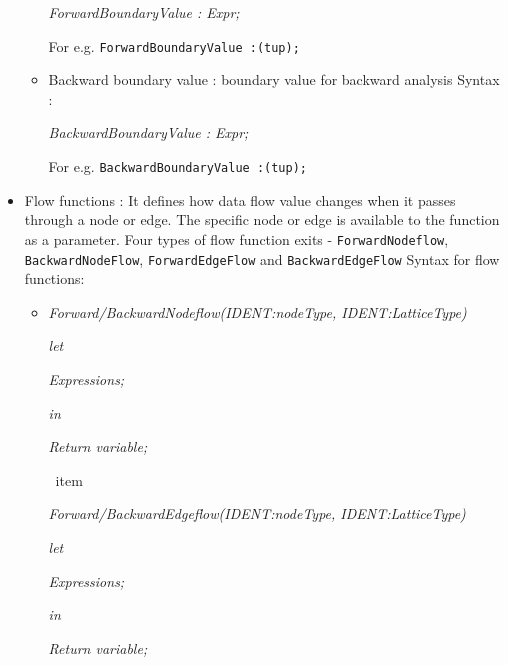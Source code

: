 \documentclass[11pt,a4paper,openright]{report}
\begin{document}
\begin{itemize}
\begin{itemize}
					    \hspace{15mm} \textit{ForwardBoundaryValue : Expr;}
					    
					    \hspace{15mm} For e.g. \texttt{ForwardBoundaryValue :(tup){};}
	\item Backward boundary value : boundary value for backward analysis
	 \newline Syntax : 
			  
					    \hspace{15mm} \textit{BackwardBoundaryValue : Expr;}
					    
					    \hspace{15mm} For e.g. \texttt{BackwardBoundaryValue :(tup){};}

					   
\end{itemize}

\item Flow functions : It defines how data flow value changes when it passes through a node or edge. The specific node or edge is available to the function as a parameter.
Four types of flow function exits - \texttt{ForwardNodeflow}, \texttt{BackwardNodeFlow}, \texttt{ForwardEdgeFlow} and \texttt{BackwardEdgeFlow}
\newline Syntax for flow functions:
\begin{itemize}
 \item 

\textit{Forward/BackwardNodeflow(IDENT:nodeType, IDENT:LatticeType)}

\textit{let}

\hspace{10mm} \textit{Expressions;}

\textit{in}

\hspace{10mm}\textit{Return variable;}
 
\ item

\textit{Forward/BackwardEdgeflow(IDENT:nodeType, IDENT:LatticeType)}

\textit{let}

\hspace{10mm}\textit{Expressions;}

\textit{in}

\hspace{10mm}\textit{Return variable;}
  
\end{itemize}

\end{itemize}
\end{document}

